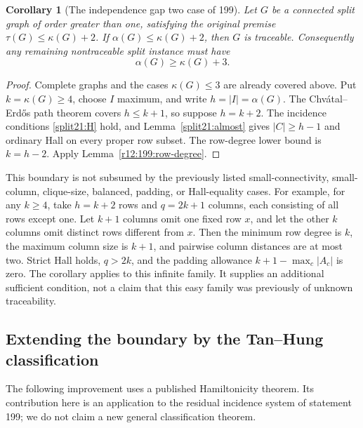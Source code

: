 \documentclass[11pt,a4paper]{article}
\newtheorem{corollary}[theorem]{Corollary}
\theoremstyle{definition}\newtheorem{definition}[theorem]{Definition}
\theoremstyle{remark}\newtheorem{remark}[theorem]{Remark}
\begin{document}
\begin{corollary}[The independence gap two case of 199]
\label{r12:199:gap-two-cor}
Let $G$ be a connected split graph of order greater than one,
satisfying the original premise $\tau(G)\le\kappa(G)+2$.
If $\alpha(G)\le\kappa(G)+2$, then $G$ is traceable.
Consequently any remaining nontraceable split instance must have
\[
 \alpha(G)\ge\kappa(G)+3.
\]
\end{corollary}
\begin{proof}
Complete graphs and the cases $\kappa(G)\le3$ are already covered
above. Put $k=\kappa(G)\ge4$, choose $I$ maximum, and write
$h=|I|=\alpha(G)$. The Chv\'atal--Erd\H{o}s path theorem covers
$h\le k+1$, so suppose $h=k+2$. The incidence conditions
\eqref{split21:H} hold, and Lemma~\ref{split21:almost} gives
$|C|\ge h-1$ and ordinary Hall on every proper row subset.
The row-degree lower bound is $k=h-2$. Apply
Lemma~\ref{r12:199:row-degree}.
\end{proof}

This boundary is not subsumed by the previously listed small-connectivity,
small-column, clique-size, balanced, padding, or Hall-equality cases.
For example, for any $k\ge4$, take $h=k+2$ rows and $q=2k+1$
columns, each consisting of all rows except one. Let $k+1$ columns
omit one fixed row $x$, and let the other $k$ columns omit distinct
rows different from $x$. Then the minimum row degree is $k$,
the maximum column size is $k+1$, and pairwise column distances
are at most two. Strict Hall holds, $q>2k$, and the padding allowance
$k+1-\max_c|A_c|$ is zero. The corollary applies to this infinite
family. It supplies an additional sufficient condition, not a claim
that this easy family was previously of unknown traceability.


\subsection{Extending the boundary by the Tan--Hung classification}
\label{r12:199:gap-three}
The following improvement uses a published Hamiltonicity theorem. Its
contribution here is an application to the residual incidence system of
statement 199; we do not claim a new general classification theorem.
\end{document}
